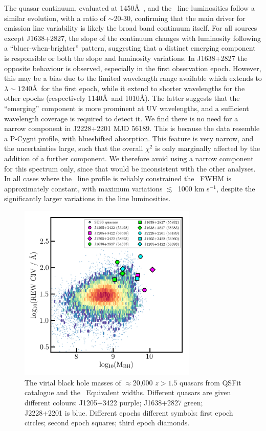 \documentclass[fleqn,usenatbib]{mnras}
\begin{document}
The quasar continuum, evaluated at 1450\AA\ , and the \civ\ line
luminosities follow a similar evolution, with a ratio of $\sim$20-30,
confirming that the main driver for emission line variability is
likely the broad band continuum itself.  For all sources except
J1638+2827, the slope of the continuum changes with luminosity
following a ``bluer-when-brighter'' pattern, suggesting that a
distinct emerging component is responsible or both the slope and
luminosity variations.  In J1638+2827 the opposite behaviour is
observed, especially in the first observation epoch.  However, this
may be a bias due to the limited wavelength range available which
extends to $\lambda \sim 1240$\AA\ for the first epoch, while it extend
to shorter wavelengths for the other epochs (respectively 1140\AA\ and
1010\AA).  The latter suggests that the ``emerging'' component is more
prominent at UV wavelengths, and a sufficient wavelength coverage is
required to detect it. We find there is no need for a narrow component
in J2228+2201 MJD 56189.  This is because the data resemble a P-Cygni
profile, with blueshifted absorption. This feature is very narrow, and
the uncertainties large, such that the overall $\chi^{2}$ is only
marginally affected by the addition of a further component. We
therefore avoid using a narrow component for this spectrum only, since
that would be inconsistent with the other analyses.
In all cases where the \civ\ line profile is reliably constrained the
\civ\ FWHM is approximately constant, with maximum variations
$\lesssim$~1000 km s$^{-1}$, despite the significantly larger
variations in the line luminosities.


\begin{figure}
  \centering
  \includegraphics[width=8.5cm, trim=0.2cm 0.2cm 0.0cm 0.2cm, clip]
  {figures/CIV_CLQs_MBHvsREW_QSFit20K.png}
   \vspace{-12pt}
   \caption[]{The virial black hole masses of $\approx$20,000 $z>1.5$ quasars
     from QSFit catalogue \citep{Calderone2017} and the \civ\ Equivalent widths.
     Different quasars are given different colours: J1205+3422 purple; J1638+2827 green; J2228+2201 is blue.
     Different epochs different symbols: first epoch circles; second epoch squares; third epoch diamonds. 
   }
  \label{fig:CIV_MBHvsREW}
\end{figure}
\end{document}
